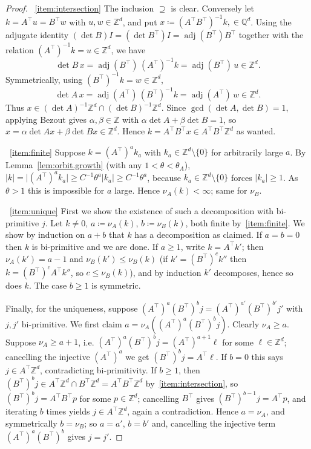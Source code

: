 \documentclass[11pt,reqno]{amsart}
\theoremstyle{plain}
\theoremstyle{definition}
\newcommand{\Z}{\mathbb{Z}}
\newcommand{\Q}{\mathbb{Q}}
\DeclareMathOperator{\adj}{adj}
\begin{document}
\begin{proof}
    ~\ref{item:intersection}  The inclusion \( \supseteq \) is clear.
    Conversely let \( k=A^{\top}u=B^{\top}w \) with \( u,w\in\Z^d \), and put \( x\coloneqq (A^\top B^\top)^{-1}k,\in\Q^d \).
    Using the adjugate identity \( (\det B)I = (\det B^\top)I = \adj(B^{\top})B^{\top}\) together with the relation \( (A^{\top})^{-1}k=u\in\Z^d \), we have
    \[
        \det B\,x=\adj(B^{\top})\,(A^{\top})^{-1}k=\adj(B^{\top})\,u\in\Z^d.
    \]
    Symmetrically, using \( (B^{\top})^{-1}k=w\in\Z^d \),
    \[
        \det A \,x=\adj(A^{\top})\,(B^{\top})^{-1}k=\adj(A^{\top})\,w\in\Z^d .
    \]
    Thus \( x\in(\det A)^{-1}\Z^d\cap(\det B)^{-1}\Z^d \).
    Since \( \gcd(\det A,\det B)=1 \), applying Bezout gives \( \alpha,\beta\in\Z \) with \( \alpha\det A+\beta\det B=1 \), so \( x=\alpha\det A x+\beta\det Bx\in\Z^d \).
    Hence \( k=A^{\top}B^{\top}x\in A^{\top}B^{\top}\Z^d \) as wanted.

    ~\ref{item:finite}  Suppose \( k=(A^{\top})^{a}k_a \) with \( k_a\in\Z^d\setminus\{0\} \) for arbitrarily large \( a \).
    By Lemma~\ref{lem:orbit.growth} (with any \( 1<\theta<\theta_A \)), \( \lvert k \rvert=\lvert (A^{\top})^{a}k_a \rvert\ge C^{-1}\theta^{a}\lvert k_a \rvert\ge  C^{-1}\theta^{a} \), because \( k_a\in\Z^d\setminus\{0\} \) forces \( \lvert k_a \rvert\ge1 \).
    As \( \theta>1 \) this is impossible for \( a \) large.
    Hence \( \nu_A(k)<\infty \); same for \( \nu_B \).

    ~\ref{item:unique}  First we show the existence of such a decomposition with bi-primitive \(j\).
    Let \( k\neq0 \), \( a\coloneqq \nu_A(k) \), \( b\coloneqq \nu_B(k) \), both finite by~\ref{item:finite}.
    We show by induction on \( a+b \) that \( k \) has a decomposition as claimed.
    If \( a=b=0 \) then \( k \) is bi-primitive and we are done.
    If \( a\ge1 \), write \( k=A^{\top}k' \); then \( \nu_A(k')=a-1 \) and \( \nu_B(k')\le\nu_B(k) \) (if \( k'=(B^{\top})^{c}k'' \) then \( k=(B^\top)^cA^\top k'' \), so \( c\le\nu_B(k) \)), and by induction \( k' \) decomposes, hence so does \( k \).
    The case \( b\ge1 \) is symmetric.

    Finally, for the uniqueness, suppose \( (A^{\top})^{a}(B^{\top})^{b}j=(A^{\top})^{a'}(B^{\top})^{b'}j' \) with \( j,j' \) bi-primitive.
    We first claim \( a=\nu_A\left((A^{\top})^{a}(B^{\top})^{b}j\right) \).
    Clearly \( \nu_A\ge a \).
    Suppose \( \nu_A\ge a+1 \), i.e. \( (A^{\top})^{a}(B^{\top})^{b}j=(A^{\top})^{a+1}\ell \) for some \( \ell\in\Z^d \); cancelling the injective \( (A^{\top})^{a} \) we get \( (B^{\top})^{b}j=A^{\top}\ell \).
    If \( b=0 \) this says \( j\in A^{\top}\Z^d \), contradicting bi-primitivity.
    If \( b\ge1 \), then \( (B^{\top})^{b}j\in A^{\top}\Z^d\cap B^{\top}\Z^d=A^{\top}B^{\top}\Z^d \) by~\ref{item:intersection}, so \( (B^{\top})^{b}j=A^{\top}B^{\top}p \) for some \( p\in\Z^d \); cancelling \( B^{\top} \) gives \( (B^{\top})^{b-1}j=A^{\top}p \), and iterating \( b \) times yields \( j\in A^{\top}\Z^d \), again a contradiction.
    Hence \( a=\nu_A \), and symmetrically \( b=\nu_B \); so \( a=a' \), \( b=b' \) and, cancelling the injective term \( (A^{\top})^{a}(B^{\top})^{b} \) gives \( j=j' \).
\end{proof}
\end{document}

